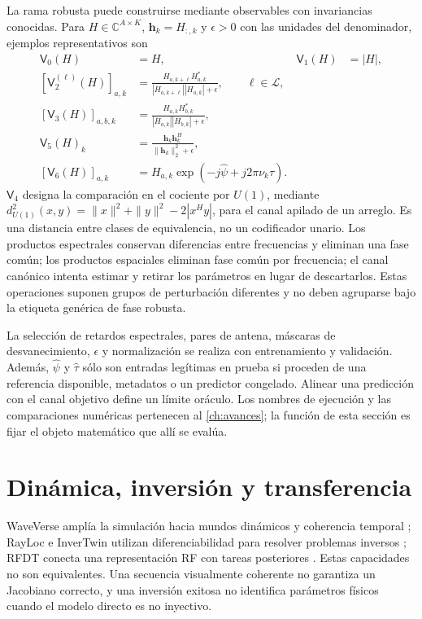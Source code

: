 La rama robusta puede construirse mediante observables con invariancias conocidas.
Para $H\in\mathbb C^{A\times K}$, $\mathbf h_k=H_{:,k}$ y $\epsilon>0$ con las
unidades del denominador, ejemplos representativos son
\begin{align}
\mathsf V_0(H)&=H, &\mathsf V_1(H)&=|H|,\nonumber\\
[\mathsf V_2^{(\ell)}(H)]_{a,k}&=\frac{H_{a,k+\ell}H_{a,k}^{*}}
{|H_{a,k+\ell}||H_{a,k}|+\epsilon},\qquad \ell\in\mathcal L,
\label{eq:v_frequency_products}\\
[\mathsf V_3(H)]_{a,b,k}&=\frac{H_{a,k}H_{b,k}^{*}}
{|H_{a,k}||H_{b,k}|+\epsilon},\label{eq:v_antenna_products}\\
\mathsf V_5(H)_k&=\frac{\mathbf h_k\mathbf h_k^{H}}
{\|\mathbf h_k\|_2^2+\epsilon},\label{eq:v_spatial_gram}\\
[\mathsf V_6(H)]_{a,k}&=H_{a,k}\exp(-j\widehat\psi+j2\pi\nu_k\widehat\tau).
\label{eq:v_canonical_channel}
\end{align}
$\mathsf V_4$ designa la comparación en el cociente por $U(1)$, mediante
$d_{U(1)}^2(x,y)=\|x\|^2+\|y\|^2-2|x^Hy|$, para el canal apilado de un arreglo.
Es una distancia entre clases de equivalencia, no un codificador unario. Los
productos espectrales conservan diferencias entre frecuencias y eliminan una fase
común; los productos espaciales eliminan fase común por frecuencia; el canal
canónico intenta estimar y retirar los parámetros en lugar de descartarlos. Estas
operaciones suponen grupos de perturbación diferentes y no deben agruparse bajo la
etiqueta genérica de fase robusta.

La selección de retardos espectrales, pares de antena, máscaras de desvanecimiento,
$\epsilon$ y normalización se realiza con entrenamiento y validación. Además,
$\widehat\psi$ y $\widehat\tau$ sólo son entradas legítimas en prueba si proceden
de una referencia disponible, metadatos o un predictor congelado. Alinear una
predicción con el canal objetivo define un límite oráculo. Los nombres de ejecución
y las comparaciones numéricas pertenecen al \cref{ch:avances}; la función de esta
sección es fijar el objeto matemático que allí se evalúa.

\section{Dinámica, inversión y transferencia}

WaveVerse amplía la simulación hacia mundos dinámicos y coherencia temporal
\citep{Zheng2026WaveVerse}; RayLoc e InverTwin utilizan diferenciabilidad para resolver
problemas inversos \citep{Han2026RayLoc,Chen2025InverTwin}; RFDT conecta una
representación RF con tareas posteriores \citep{Chen2026RFDT}. Estas capacidades no
son equivalentes. Una secuencia visualmente coherente no garantiza un Jacobiano correcto,
y una inversión exitosa no identifica parámetros físicos cuando el modelo directo es
no inyectivo.


